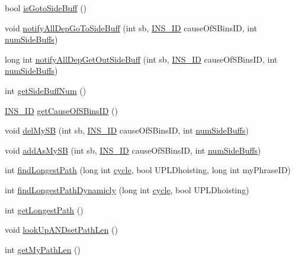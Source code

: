 \begin{DoxyCompactItemize}
\item 
bool \hyperlink{classinstruction_aa6a5b8a0b7f5af780d1593890e87d6a1}{isGotoSideBuff} ()
\item 
void \hyperlink{classinstruction_ae57b38a2a8bfab07e1bc6de8add821ae}{notifyAllDepGoToSideBuff} (int sb, \hyperlink{global_2global_8h_a1883c47d0023d0f200e1d86eced6a070}{INS\_\-ID} causeOfSBinsID, int \hyperlink{backend_2parser_8cpp_a33b052a847ffe72153acdfeaa15c48da}{numSideBuffs})
\item 
long int \hyperlink{classinstruction_aed884db7d433b78579a964299889823f}{notifyAllDepGetOutSideBuff} (int sb, \hyperlink{global_2global_8h_a1883c47d0023d0f200e1d86eced6a070}{INS\_\-ID} causeOfSBinsID, int \hyperlink{backend_2parser_8cpp_a33b052a847ffe72153acdfeaa15c48da}{numSideBuffs})
\item 
int \hyperlink{classinstruction_ae70e85f10d54bf8f323110dd8ecd7d14}{getSideBuffNum} ()
\item 
\hyperlink{global_2global_8h_a1883c47d0023d0f200e1d86eced6a070}{INS\_\-ID} \hyperlink{classinstruction_a985a2aa4c8de04b094e19706661db0a3}{getCauseOfSBinsID} ()
\item 
void \hyperlink{classinstruction_a4806e5843e16d1893f218756ea3a8a94}{delMySB} (int sb, \hyperlink{global_2global_8h_a1883c47d0023d0f200e1d86eced6a070}{INS\_\-ID} causeOfSBinsID, int \hyperlink{backend_2parser_8cpp_a33b052a847ffe72153acdfeaa15c48da}{numSideBuffs})
\item 
void \hyperlink{classinstruction_a3498bf7e8b209d7912ef7c0bc977b5b2}{addAsMySB} (int sb, \hyperlink{global_2global_8h_a1883c47d0023d0f200e1d86eced6a070}{INS\_\-ID} causeOfSBinsID, int \hyperlink{backend_2parser_8cpp_a33b052a847ffe72153acdfeaa15c48da}{numSideBuffs})
\item 
int \hyperlink{classinstruction_a7415b29e4aaa425287031bc867951d55}{findLongestPath} (long int \hyperlink{vliwScheduler_8cpp_a1f4871d45089b039d95d3832dd123827}{cycle}, bool UPLDhoisting, long int myPhraseID)
\item 
int \hyperlink{classinstruction_af85171b971c2f1f691f82501d29f3cdf}{findLongestPathDynamicly} (long int \hyperlink{vliwScheduler_8cpp_a1f4871d45089b039d95d3832dd123827}{cycle}, bool UPLDhoisting)
\item 
int \hyperlink{classinstruction_af4d93f837096be4e0dd2fe8951b1114e}{getLongestPath} ()
\item 
void \hyperlink{classinstruction_aad7cdb8a4cb4aa3f6fa92ceba462a106}{lookUpANDsetPathLen} ()
\item 
int \hyperlink{classinstruction_a48dbb40a5b7bc9bd36b3990fc61f20b2}{getMyPathLen} ()

\end{DoxyCompactItemize}
